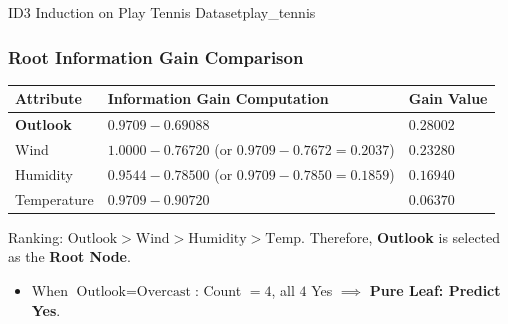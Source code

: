 \begin{example}{ID3 Induction on Play Tennis Dataset}{play_tennis}
\subsubsection{Root Information Gain Comparison}
\begin{center}\renewcommand{\arraystretch}{1.35}
\begin{tabular}{lll}
\toprule
\textbf{Attribute} & \textbf{Information Gain Computation} & \textbf{Gain Value} \\
\midrule
\textbf{Outlook}  & $0.9709 - 0.69088$ & $\mathbf{0.28002}$ \\
Wind              & $1.0000 - 0.76720$ (or $0.9709 - 0.7672 = 0.2037$) & $0.23280$ \\
Humidity          & $0.9544 - 0.78500$ (or $0.9709 - 0.7850 = 0.1859$) & $0.16940$ \\
Temperature       & $0.9709 - 0.90720$ & $0.06370$ \\
\bottomrule
\end{tabular}
\end{center}
Ranking: $\text{Outlook} > \text{Wind} > \text{Humidity} > \text{Temp}$.
Therefore, \textbf{Outlook} is selected as the \textbf{Root Node}.
\begin{itemize}
    \item When $\text{Outlook} = \text{Overcast}$: Count $= 4$, all $4$ Yes $\implies$ \textbf{Pure Leaf: Predict Yes}.
\end{itemize}


\end{example}
